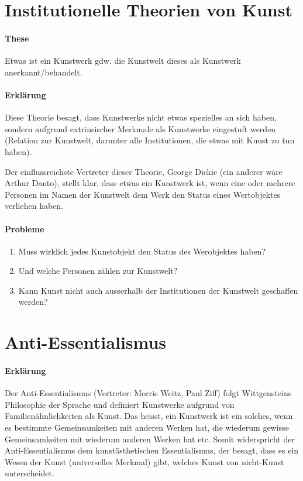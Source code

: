 \documentclass[../main.tex]{subfiles}
\begin{document}
\section{Institutionelle Theorien von Kunst}
\paragraph{These} Etwas ist ein Kunstwerk gdw. die Kunstwelt dieses als Kunstwerk anerkannt/behandelt.
\paragraph{Erklärung} Diese Theorie besagt, dass Kunstwerke nicht etwas spezielles an sich haben, sondern aufgrund extrinsischer Merkmale als Kunstwerke eingestuft werden (Relation zur Kunstwelt, darunter alle Institutionen, die etwas mit Kunst zu tun haben).

Der einflussreichste Vertreter dieser Theorie, George Dickie (ein anderer wäre Arthur Danto), stellt klar, dass etwas ein Kunstwerk ist, wenn eine oder mehrere Personen im Namen der Kunstwelt dem Werk den Status eines Wertobjektes verliehen haben.  
\paragraph{Probleme}
\begin{enumerate}
	\item Muss wirklich jedes Kunstobjekt den Status des Werobjektes haben?
	\item Und welche Personen zählen zur Kunstwelt?
	\item Kann Kunst nicht auch ausserhalb der Institutionen der Kunstwelt geschaffen werden?
\end{enumerate}

\section{Anti-Essentialismus}  
\paragraph{Erklärung} Der Anti-Essentialismus (Vertreter: Morris Weitz, Paul Ziff) folgt Wittgensteins Philosophie der Sprache und definiert Kunstwerke aufgrund von Familienähnlichkeiten als Kunst. Das heisst, ein Kunstwerk ist ein solches, wenn es bestimmte Gemeinsamkeiten mit anderen Werken hat, die wiederum gewisse Gemeinsamkeiten mit wiederum anderen Werken hat etc. Somit widerspricht der Anti-Essentialismus dem kunstästhetischen Essentialismus, der besagt, dass es ein Wesen der Kunst (universelles Merkmal) gibt, welches Kunst von nicht-Kunst unterscheidet.
\end{document}
